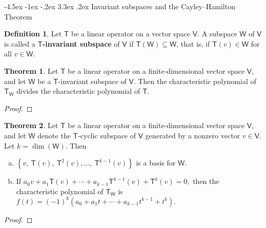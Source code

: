 \documentclass[12pt]{book}
\makeatletter
\theoremstyle{definition}
\newtheorem{theorem}{Theorem}[chapter]
\newtheorem*{definition}{Definition}
\renewcommand\chapter{\@startsection {chapter}{0}{\z@}%
	{-4.5ex \@plus -1ex \@minus -.2ex}%
	{3.3ex \@plus.2ex}%
	{\normalfont\LARGE\bfseries}}
\makeatother
\begin{document}
	\chapter{Invariant subspaces and the Cayley–Hamilton Theorem}
	\setcounter{theorem}{20}
	\begin{definition}
		Let $\mathsf{T}$ be a linear operator on a vector space $\mathsf{V}$. A subspace $\mathsf{W}$ of $\mathsf{V}$ is called a $\mathsf{T}$\textbf{-invariant subspace} of $\mathsf{V}$ if $\mathsf{T}(\mathsf{W})\subseteq \mathsf{W}$, that is, if $\mathsf{T}(v)\in\mathsf{W}$ for all $v\in\mathsf{W}$.
	\end{definition}
	\newpage
	\begin{theorem}
		Let $\mathsf{T}$ be a linear operator on a finite-dimensional vector space $\mathsf{V}$, and let $\mathsf{W}$ be a $\mathsf{T}$-invariant subspace of $\mathsf{V}$. Then the characteristic polynomial of $\mathsf{T}_\mathsf{W}$ divides the characteristic polynomial of $\mathsf{T}$.
	\end{theorem}
	\begin{proof}
	\end{proof}
	\newpage
	\begin{theorem}
		Let $\mathsf{T}$ be a linear operator on a finite-dimensional vector space $\mathsf{V}$, and let $\mathsf{W}$ denote the $\mathsf{T}$-cyclic subspace of $\mathsf{V}$ generated by a nonzero vector $v\in\mathsf{V}$. Let $k=\dim(\mathsf{W})$. Then
		\begin{enumerate}[(a)]
			\item $\left\{v,~\mathsf{T}(v),~\mathsf{T}^2(v),\ldots,~\mathsf{T}^{k-1}(v)\right\}$ is a basis for $\mathsf{W}$.
			\item If $a_0v+a_1\mathsf{T}(v)+\cdots+a_{k-1}\mathsf{T}^{k-1}(v)+\mathsf{T}^k(v)=\mathit{0},$ then the characteristic polynomial of $\mathsf{T}_\mathsf{W}$ is $f(t)=(-1)^k(a_0+a_1t+\cdots+a_{k-1}t^{k-1}+t^k).$
		\end{enumerate}
	\end{theorem}
	\begin{proof}
	\end{proof}
	\newpage
\end{document}
